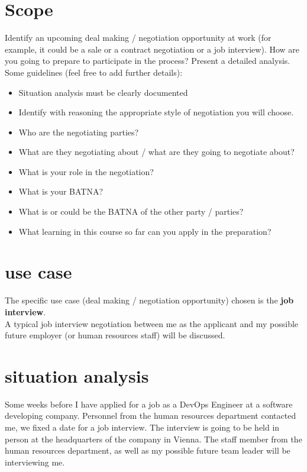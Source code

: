 \chapter{Scope}

Identify an upcoming deal making / negotiation opportunity at work (for example, it could be a sale or a contract negotiation or a job interview).
How are you going to prepare to participate in the process? Present a detailed analysis.
Some guidelines (feel free to add further details): \\

\begin{itemize}
	\item Situation analysis must be clearly documented
	\item Identify with reasoning the appropriate style of negotiation you will choose.
	\item Who are the negotiating parties?
	\item What are they negotiating about / what are they going to negotiate about?
	\item What is your role in the negotiation?
	\item What is your BATNA?
	\item What is or could be the BATNA of the other party / parties?
	\item What learning in this course so far can you apply in the preparation?
\end{itemize}



\chapter{use case}

The specific use case (deal making / negotiation opportunity) chosen is the \textbf{job interview}. \\

\noindent A typical job interview negotiation between me as the applicant and 
my possible future employer (or human resources staff) will be discussed. \\
 
\chapter{situation analysis}

Some weeks before I have applied for a job as a DevOps Engineer at 
a software developing company. Personnel from the human resources department
contacted me, we fixed a date for a job interview. The interview is going to
be held in person at the headquarters of the company in Vienna. The staff member
from the human resources department, as well as my possible future team leader
will be interviewing me. \\

